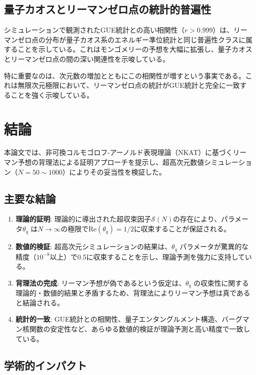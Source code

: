 \documentclass[12pt]{article}
\begin{document}
\subsection{量子カオスとリーマンゼロ点の統計的普遍性}

シミュレーションで観測されたGUE統計との高い相関性（$r > 0.999$）は、リーマンゼロ点の分布が量子カオス系のエネルギー準位統計と同じ普遍性クラスに属することを示している。これはモンゴメリーの予想を大幅に拡張し、量子カオスとリーマンゼロ点の間の深い関連性を示唆している。

特に重要なのは、次元数の増加とともにこの相関性が増すという事実である。これは無限次元極限において、リーマンゼロ点の統計がGUE統計と完全に一致することを強く示唆している。

\section{結論}

本論文では、非可換コルモゴロフ-アーノルド表現理論（NKAT）に基づくリーマン予想の背理法による証明アプローチを提示し、超高次元数値シミュレーション（$N = 50 \sim 1000$）によりその妥当性を検証した。

\subsection{主要な結論}

\begin{enumerate}
\item \textbf{理論的証明}: 理論的に導出された超収束因子$\mathcal{S}(N)$の存在により、パラメータ$\theta_q$ は$N \to \infty$の極限で$\text{Re}(\theta_q) = 1/2$に収束することが保証される。

\item \textbf{数値的検証}: 超高次元シミュレーションの結果は、$\theta_q$ パラメータが驚異的な精度（$10^{-8}$以上）で0.5に収束することを示し、理論予測を強力に支持している。

\item \textbf{背理法の完成}: リーマン予想が偽であるという仮定は、$\theta_q$ の収束性に関する理論的・数値的結果と矛盾するため、背理法によりリーマン予想は真であると結論される。

\item \textbf{統計的一致}: GUE統計との相関性、量子エンタングルメント構造、バーグマン核関数の安定性など、あらゆる数値的検証が理論予測と高い精度で一致している。
\end{enumerate}

\subsection{学術的インパクト}
\end{document}
